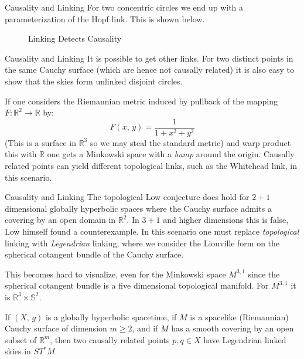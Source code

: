 \documentclass{beamer}
\begin{document}
    \begin{frame}{Causality and Linking}
        For two concentric circles we end up with a parameterization of the
        Hopf link. This is shown below.
        \begin{figure}
            \centering
            \caption{Linking Detects Causality}
            \label{fig:linking_detects_causality_001}
        \end{figure}
    \end{frame}
    \begin{frame}{Causality and Linking}
        It is possible to get other links. For two distinct points in the same
        Cauchy surface (which are hence not causally related) it is also easy
        to show that the skies form unlinked disjoint circles.
        \par\hfill\par
        If one considers the Riemannian metric induced by pullback of the
        mapping $F:\mathbb{R}^{2}\rightarrow\mathbb{R}$ by:
        \begin{equation}
            F(x,\,y)=\frac{1}{1+x^{2}+y^{2}}
        \end{equation}
        (This is a surface in $\mathbb{R}^{3}$ so we may steal the standard
        metric) and warp product this with $\mathbb{R}$ one gets a Minkowski
        space with a \textit{bump} around the origin. Causally related points
        can yield different topological links, such as the Whitehead link, in
        this scenario.
    \end{frame}
    \begin{frame}{Causality and Linking}
        The topological Low conjecture does hold for $2+1$ dimensional globally
        hyperbolic spaces where the Cauchy surface admits a covering by an open
        domain in $\mathbb{R}^{2}$. In $3+1$ and higher dimensions this is
        false, Low himself found a counterexample. In this scenario one must
        replace \textit{topological} linking with \textit{Legendrian} linking,
        where we consider the Liouville form on the spherical cotangent bundle
        of the Cauchy surface.
        \par\hfill\par
        This becomes hard to visualize, even for the Minkowski space $M^{3,1}$
        since the spherical cotangent bundle is a five dimensional topological
        manifold. For $M^{3,1}$ it is $\mathbb{R}^{3}\times\mathbb{S}^{2}$.
    \end{frame}
    \begin{theorem}
        \begin{theorem}
            If $(X,\,g)$ is a globally hyperbolic spacetime, if $M$ is a
            spacelike (Riemannian) Cauchy surface of dimension $m\geq{2}$, and
            if $M$ has a smooth covering by an open subset of $\mathbb{R}^{m}$,
            then two causally related points $p,q\in{X}$ have Legendrian linked
            skies in $ST^{*}M$.
        \end{theorem}
    \end{theorem}
\end{document}
